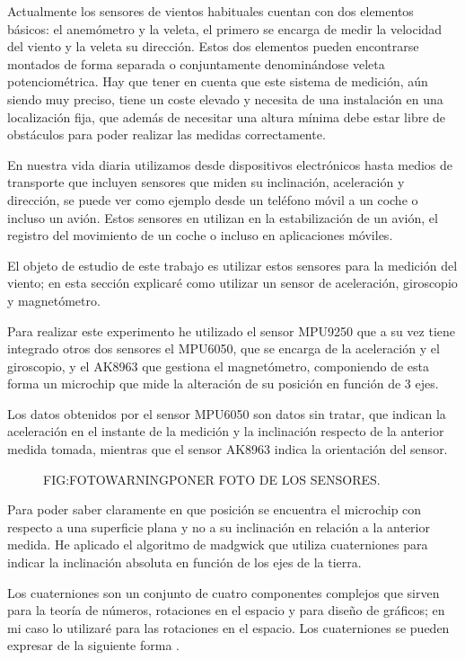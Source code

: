 
 Actualmente los sensores de vientos habituales cuentan con dos elementos básicos: el anemómetro y la veleta, el primero se encarga de medir la velocidad del viento y la veleta su dirección. Estos dos elementos pueden encontrarse montados de forma separada o conjuntamente denominándose veleta potenciométrica.
 Hay que tener en cuenta que este sistema de medición, aún siendo muy preciso, tiene un coste elevado y necesita de una instalación en una localización fija, que además de necesitar una altura mínima debe estar libre de obstáculos para poder realizar las medidas correctamente.
 
 En nuestra vida diaria utilizamos desde dispositivos electrónicos hasta medios de transporte que incluyen sensores que miden su inclinación, aceleración y dirección, se puede ver como ejemplo desde un teléfono móvil a un coche o incluso un avión.
 Estos sensores en utilizan en la estabilización de un avión, el registro del movimiento de un coche o incluso en aplicaciones móviles.
 
 El objeto de estudio de este trabajo es utilizar estos sensores para la medición del viento; en esta sección explicaré como utilizar un sensor de aceleración, giroscopio y magnetómetro.
 
 Para realizar este experimento he utilizado el sensor MPU9250\cite{InvenSense2016} que a su vez tiene integrado otros dos sensores el MPU6050, que se encarga de la aceleración y el giroscopio, y el AK8963 que gestiona el magnetómetro, componiendo de esta forma un microchip que mide la alteración de su posición en función de 3 ejes.
 
 Los datos obtenidos por el sensor MPU6050 son datos sin tratar, que indican la aceleración en el instante de la medición y la inclinación respecto de la anterior medida tomada, mientras que el sensor AK8963 indica la orientación del sensor.
 
\begin{figure}{FIG:FOTOWARNING}{PONER FOTO DE LOS SENSORES.}
\end{figure}
 
 Para poder saber claramente en que posición se encuentra el microchip con respecto a una superficie plana y no a su inclinación en relación a la anterior medida. He aplicado el algoritmo de madgwick que utiliza cuaterniones para indicar la inclinación absoluta en función de los ejes de la tierra. 
 
 Los cuaterniones son un conjunto de cuatro componentes complejos que sirven para la teoría de números, rotaciones en el espacio y para diseño de gráficos; en mi caso lo utilizaré para las rotaciones en el espacio. Los cuaterniones se pueden expresar de la siguiente forma \cite{Graves1999}.
 
